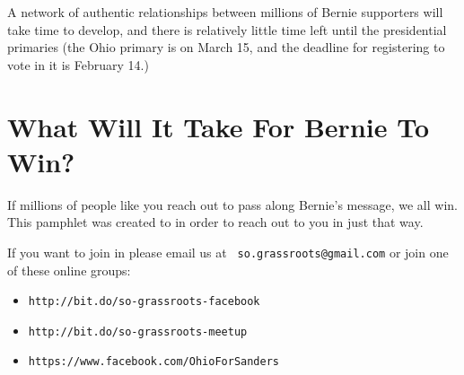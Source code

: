 \documentclass[notumble]{leaflet}
\begin{document}
A network of authentic relationships between millions of Bernie
supporters will take time to develop, and there is relatively little
time left until the presidential primaries (the Ohio primary is on
March 15, and the deadline for registering to vote in it is February
14.)

\section*{What Will It Take For Bernie To Win?}

If millions of people like you reach out to pass along Bernie's
message, we all win.  This pamphlet was created to in order to reach
out to you in just that way.

If you want to join in please email us at {\tt
  so.grassroots@gmail.com} or join one of these online groups:

\begin{itemize}

\item {\tt http://bit.do/so-grassroots-facebook}
\item {\tt http://bit.do/so-grassroots-meetup}
\item {\tt https://www.facebook.com/OhioForSanders}

\end{itemize}
\end{document}
